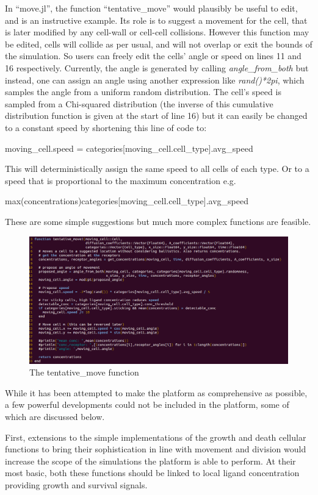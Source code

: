 \documentclass[12pt]{article}
\begin{document}
In ``move.jl'', the function ``tentative\_move'' would plausibly be 
useful to edit, and is an instructive example. Its role is to suggest a 
movement for the cell, that is later modified by any cell-wall or 
cell-cell collisions. However this function may be edited, cells will 
collide as per usual, and will not overlap or exit the bounds of the 
simulation. So users can freely edit the cells' angle or speed on lines 
11 and 16 respectively. Currently, the angle is generated by calling 
{\itshape angle\_from\_both} but instead, one can assign an angle using 
another expression like {\itshape rand()*2pi}, which samples the angle 
from a uniform random distribution. The cell's speed is sampled from a 
Chi-squared distribution (the inverse of this cumulative distribution 
function is given at the start of line 16) but it can easily be changed 
to a constant speed by shortening this line of code to:

{\fontsize{10pt}{10pt} \ttfamily
moving\_cell.speed = categories{[}moving\_cell.cell\_type{]}.avg\_speed} 

This will deterministically assign the same speed to all cells of 
each type. Or to a speed that is proportional to the maximum 
concentration e.g. 

{\fontsize{10pt}{10pt}\ttfamily 
max(concentrations)categories{[}moving\_cell.cell\_type{]}.avg\_speed} 

These are some simple suggestions but much more complex functions are 
feasible.

\begin{figure}[H]
\centering
\includegraphics[width=11.23cm]{media/tentativemove.png}
\caption{The tentative\_move function}
\end{figure}

While it has been attempted to make the platform as comprehensive as 
possible, a few powerful developments could not be included in the 
platform, some of which are discussed below. 

First, extensions to the simple implementations of the growth and death 
cellular functions to bring their sophistication in line with movement 
and division would increase the scope of the simulations the platform is 
able to perform. At their most basic, both these functions should be 
linked to local ligand concentration providing growth and survival 
signals. 
\end{document}
